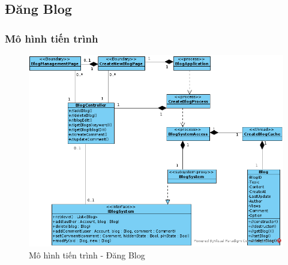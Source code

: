 \documentclass[./../main.tex]{subfiles}
\begin{document}
\subsection{Đăng Blog}

\subsubsection{Mô hình tiến trình}

\begin{figure}[H]
	\centering
	\includegraphics[width=\linewidth]{./images/pv_Blog.png}
\caption{Mô hình tiến trình - Đăng Blog}
\end{figure}
\end{document}
